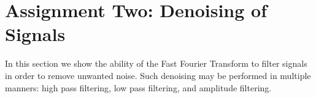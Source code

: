 
\section{Assignment Two: Denoising of Signals} %
\label{sec:assignment_two_denoising_of_signals}

In this section we show the ability of the Fast Fourier Transform to filter signals in order to remove unwanted noise. Such denoising may be performed in multiple manners: high pass filtering, low pass filtering, and amplitude filtering.

